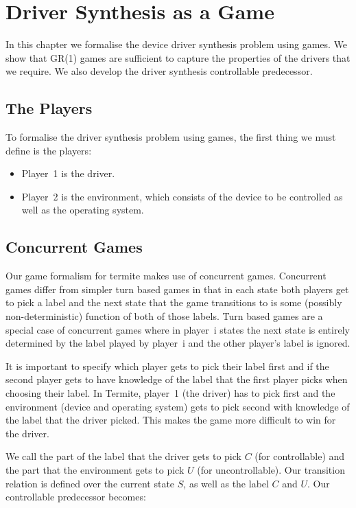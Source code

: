\chapter{Driver Synthesis as a Game}

In this chapter we formalise the device driver synthesis problem using games. We show that GR(1) games are sufficient to capture the properties of the drivers that we require. We also develop the driver synthesis controllable predecessor.

\section{The Players}

To formalise the driver synthesis problem using games, the first thing we must define is the players:

\begin{itemize}
    \item Player~1 is the driver. 
    \item Player~2 is the environment, which consists of the device to be controlled as well as the operating system.
\end{itemize}


\section{Concurrent Games}

Our game formalism for termite makes use of concurrent games. Concurrent games differ from simpler turn based games in that in each state both players get to pick a label and the next state that the game transitions to is some (possibly non-deterministic) function of both of those labels. Turn based games are a special case of concurrent games where in player~i states the next state is entirely determined by the label played by player~i and the other player's label is ignored. 

It is important to specify which player gets to pick their label first and if the second player gets to have knowledge of the label that the first player picks when choosing their label. In Termite, player~1 (the driver) has to pick first and the environment (device and operating system) gets to pick second with knowledge of the label that the driver picked. This makes the game more difficult to win for the driver.

We call the part of the label that the driver gets to pick $C$ (for controllable) and the part that the environment gets to pick $U$ (for uncontrollable). Our transition relation is defined over the current state $S$, as well as the label $C$ and $U$. Our controllable predecessor becomes: 

